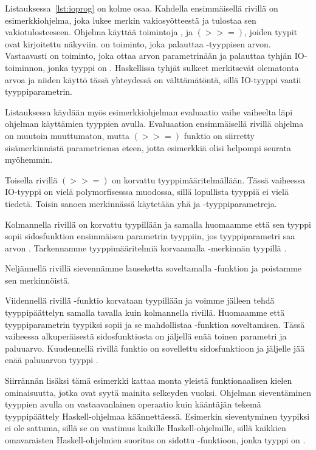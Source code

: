 \documentclass[finnish]{tktltiki2}
\begin{document}
Listauksessa~\ref{lst:ioprog} on kolme osaa. Kahdella ensimmäisellä rivillä on esimerkkiohjelma,
joka lukee merkin vakiosyötteestä ja tulostaa sen vakiotulosteeseen. Ohjelma käyttää toimintoja
,  ja $(>>=)$, joiden tyypit ovat kirjoitettu näkyviin. 
on toiminto, joka palauttaa -tyyppisen arvon. Vastaavasti  on toiminto,
joka ottaa  arvon parametrinään ja palauttaa tyhjän IO-toiminnon, jonka tyyppi on
. Haskellissa tyhjät sulkeet merkitsevät olematonta arvoa ja niiden käyttö tässä
yhteydessä on välttämätöntä, sillä IO-tyyppi vaatii tyyppiparametrin.

Listauksessa käydään myös esimerkkiohjelman evaluaatio vaihe vaiheelta läpi ohjelman käyttämien
tyyppien avulla. Evaluaation ensimmäisellä rivillä ohjelma on muutoin muuttumaton, mutta $(>>=)$
funktio on siirretty sisämerkinnästä parametriensa eteen, jotta esimerkkiä olisi helpompi seurata
myöhemmin.

Toisella rivillä $(>>=)$ on korvattu tyyppimääritelmällään. Tässä vaiheessa IO-tyyppi on vielä
polymorfisesssa muodossa, sillä lopullista tyyppiä ei vielä tiedetä. Toisin sanoen merkinnässä
käytetään yhä  ja  -tyyppiparametreja.

Kolmannella rivillä  on korvattu tyypillään ja samalla huomaamme että sen tyyppi sopii
sidosfunktion ensimmäisen parametrin tyyppiin, jos tyyppiparametri  saa arvon .
Tarkennamme tyyppimääritelmiä korvaamalla  -merkinnän tyypillä .

Neljännellä rivillä sievennämme lauseketta soveltamalla -funktion ja poistamme sen
merkinnöistä. 

Viidennellä rivillä -funktio korvataan tyypillään ja voimme jälleen tehdä
tyyppipäättelyn samalla tavalla kuin kolmannella rivillä. Huomaamme että tyyppiparametrin 
tyypiksi sopii \code{()} ja se mahdollistaa -funktion soveltamisen. Tässä vaiheessa
alkuperäisestä sidosfunktiosta on jäljellä enää toinen parametri ja paluuarvo. Kuudennellä rivillä
funktio  on sovellettu sidosfunktioon ja jäljelle jää enää paluuarvon tyyppi .

Siirrännän lisäksi tämä esimerkki kattaa monta yleistä funktionaalisen kielen ominaisuutta, jotka
ovat syytä mainita selkeyden vuoksi. Ohjelman sieventäminen tyyppien avulla on vastaavanlainen
operaatio kuin kääntäjän tekemä tyyppipäättely Haskell-ohjelmaa käännettäessä. Esimerkin
sieventyminen tyypiksi  ei ole sattuma, sillä se on vaatimus kaikille
Haskell-ohjelmille, sillä kaikkien omavaraisten Haskell-ohjelmien suoritus on sidottu
-funktioon, jonka tyyppi on .
\end{document}
